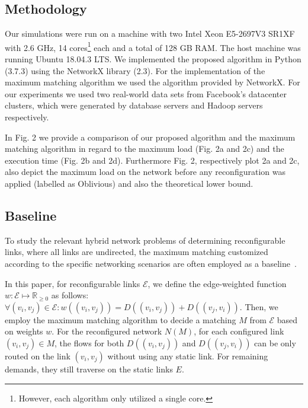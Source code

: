 \documentclass[sigconf]{acmart}
\newcommand{\E}{\mathcal{E}}  %
\begin{document}
\subsection{Methodology}\label{subsec:methodology}
Our simulations were run on a machine with two Intel Xeon E5-2697V3 SR1XF with 2.6 GHz, 14 cores\footnote{However, each algorithm only utilized a single core.} each and a total of 128 GB RAM.
The host machine was running Ubuntu 18.04.3 LTS.
We implemented the proposed algorithm in Python (3.7.3) using the NetworkX library (2.3). For the implementation of the maximum matching algorithm we used the algorithm provided by NetworkX. 
For our experiments we used two real-world data sets from Facebook's datacenter clusters, which were generated by database servers and Hadoop servers respectively. 

In Fig. 2 we provide a comparison of our proposed algorithm and the maximum matching algorithm in regard to the maximum load (Fig. 2a and 2c) and the execution time (Fig. 2b and 2d). Furthermore Fig. 2, respectively plot 2a and 2c, also depict the maximum load on the network before any reconfiguration was applied (labelled as Oblivious) and also the theoretical lower bound. 

\subsection{Baseline}\label{subsec:baseline}
To study the relevant hybrid network problems of determining reconfigurable links, where all links are undirected, the maximum matching customized according to the specific networking scenarios are often employed as a baseline~\cite{networking19,cthrough}.  

In this paper, for reconfigurable links $\E$, we define the edge-weighted function $w:\E\mapsto\mathbb{R}_{\ge0}$ as follows: $\forall (v_i,v_j)\in \E: w\left( (v_i,v_j)\right)= D\left((v_i,v_j) \right)+ D\left((v_j,v_i) \right)$. Then, we employ the maximum matching algorithm to decide a matching $M$ from $\E$ based on weights $w$. For the reconfigured network $N(M)$, for each configured link $(v_i,v_j)\in M$, the flows for both  $D\left((v_i,v_j)\right)$ and $D\left((v_j,v_i)\right) $ can be only routed on the  link $(v_i,v_j)$ without using any  static link. For remaining demands, they still traverse on the  static links $E$.
\end{document}
